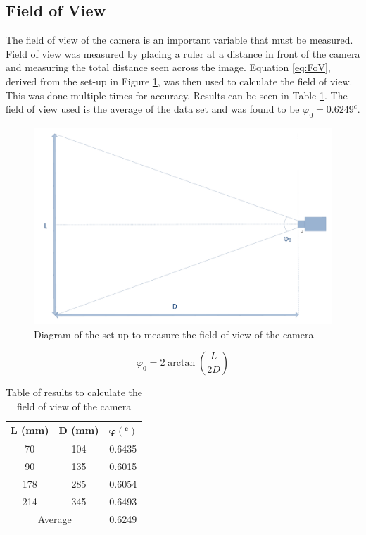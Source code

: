 \subsection{Field of View}
The field of view of the camera is an important variable that must be measured. Field of view was measured by placing a ruler at a distance in front of the camera and measuring the total distance seen across the image. Equation \eqref{eq:FoV}, derived from the set-up in Figure \ref{fig:FoV}, was then used to calculate the field of view. This was done multiple times for accuracy. Results can be seen in Table \ref{table:fieldofview}. The field of view used is the average of the data set and was found to be $\varphi_0 = 0.6249^c$. 
\begin{figure}
\includegraphics[width=\textwidth]{Figures/FoV.pdf}
\caption{Diagram of the set-up to measure the field of view of the camera}
\label{fig:FoV}
\end{figure}
\begin{equation}\label{eq:FoV}
\varphi_0 = 2\arctan\left(\frac{L}{2D}\right)
\end{equation}
\begin{table}
\caption{Table of results to calculate the field of view of the camera}
\label{table:fieldofview}
\centering
\begin{tabular}{ccc} \toprule
\textbf{L (mm)} & \textbf{D (mm)} &$\boldsymbol{\varphi (^c)}$ \\ \toprule
70 & 104 & 0.6435\\\midrule
90 & 135 &0.6015\\\midrule
178 & 285 &0.6054\\ \midrule
214 & 345 &0.6493 \\ \bottomrule
\multicolumn{2}{c}{Average} & 0.6249 \\ \bottomrule
\end{tabular}

\end{table}



